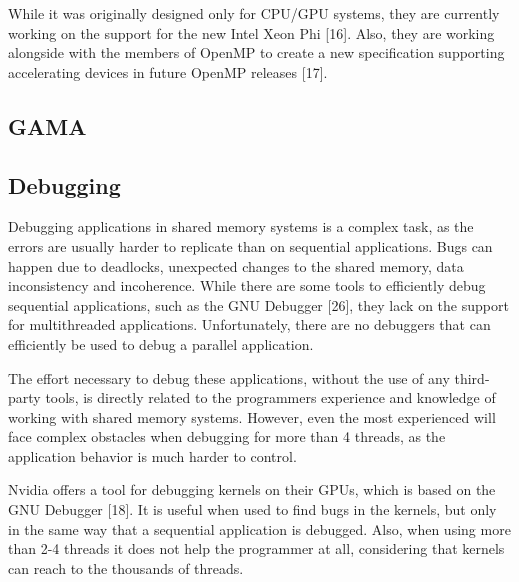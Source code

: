 While it was originally designed only for CPU/GPU systems, they are currently working on the support for the new Intel Xeon Phi [16]. Also, they are working alongside with the members of OpenMP to create a new specification supporting accelerating devices in future OpenMP releases [17].

\subsection{GAMA}


\subsection{Debugging}

Debugging applications in shared memory systems is a complex task, as the errors are usually harder to replicate than on sequential applications. Bugs can happen due to deadlocks, unexpected changes to the shared memory, data inconsistency and incoherence. While there are some tools to efficiently debug sequential applications, such as the GNU Debugger [26], they lack on the support for multithreaded applications. Unfortunately, there are no debuggers that can efficiently be used to debug a parallel application.

The effort necessary to debug these applications, without the use of any third-party tools, is directly related to the programmers experience and knowledge of working with shared memory systems. However, even the most experienced will face complex obstacles when debugging for more than 4 threads, as the application behavior is much harder to control.

Nvidia offers a tool for debugging \cuda kernels on their GPUs, which is based on the GNU Debugger [18]. It is useful when used to find bugs in the kernels, but only in the same way that a sequential application is debugged. Also, when using more than 2-4 \cuda threads it does not help the programmer at all, considering that \cuda kernels can reach to the thousands of threads.

\newpage
